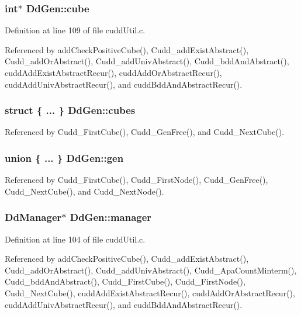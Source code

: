 \subsubsection{\setlength{\rightskip}{0pt plus 5cm}int$\ast$ \bf{Dd\-Gen::cube}}\label{structDdGen_08e91eb3192955502ec878d31d4849f7}




Definition at line 109 of file cudd\-Util.c.

Referenced by add\-Check\-Positive\-Cube(), Cudd\_\-add\-Exist\-Abstract(), Cudd\_\-add\-Or\-Abstract(), Cudd\_\-add\-Univ\-Abstract(), Cudd\_\-bdd\-And\-Abstract(), cudd\-Add\-Exist\-Abstract\-Recur(), cudd\-Add\-Or\-Abstract\-Recur(), cudd\-Add\-Univ\-Abstract\-Recur(), and cudd\-Bdd\-And\-Abstract\-Recur().
\subsubsection{\setlength{\rightskip}{0pt plus 5cm}struct \{ ... \}   \bf{Dd\-Gen::cubes}}\label{structDdGen_9e623e8b9843e7455c4ae4225f97be84}




Referenced by Cudd\_\-First\-Cube(), Cudd\_\-Gen\-Free(), and Cudd\_\-Next\-Cube().
\subsubsection{\setlength{\rightskip}{0pt plus 5cm}union \{ ... \}   \bf{Dd\-Gen::gen}}\label{structDdGen_48e1ed569e2355b0a313fda5b75c1de1}




Referenced by Cudd\_\-First\-Cube(), Cudd\_\-First\-Node(), Cudd\_\-Gen\-Free(), Cudd\_\-Next\-Cube(), and Cudd\_\-Next\-Node().
\subsubsection{\setlength{\rightskip}{0pt plus 5cm}\bf{Dd\-Manager}$\ast$ \bf{Dd\-Gen::manager}}\label{structDdGen_ef063764628a41946a9185343b47723e}




Definition at line 104 of file cudd\-Util.c.

Referenced by add\-Check\-Positive\-Cube(), Cudd\_\-add\-Exist\-Abstract(), Cudd\_\-add\-Or\-Abstract(), Cudd\_\-add\-Univ\-Abstract(), Cudd\_\-Apa\-Count\-Minterm(), Cudd\_\-bdd\-And\-Abstract(), Cudd\_\-First\-Cube(), Cudd\_\-First\-Node(), Cudd\_\-Next\-Cube(), cudd\-Add\-Exist\-Abstract\-Recur(), cudd\-Add\-Or\-Abstract\-Recur(), cudd\-Add\-Univ\-Abstract\-Recur(), and cudd\-Bdd\-And\-Abstract\-Recur().
